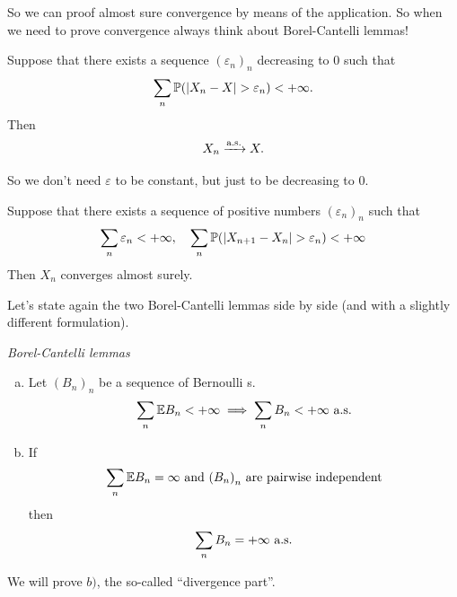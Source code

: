 \documentclass{report}
\begin{document}
So we can proof almost sure convergence by means of the application. So when we need to prove convergence always think about Borel-Cantelli lemmas!
\begin{proposition}
	Suppose that there exists a sequence ${(\varepsilon_n)}_{n}$ decreasing to 0 such that
	\[\sum_n\pr(|X_n-X|>\varepsilon_n)<+\infty.\]
	Then
	\[X_n\xrightarrow[]{\text{a.s.}} X.\]
\end{proposition}
So we don't need $\varepsilon$ to be constant, but just to be decreasing to 0.
\begin{proposition}
	Suppose that there exists a sequence of positive numbers ${(\varepsilon_n)}_{n}$ such that
	\[\sum_n\varepsilon_n<+\infty,\quad\sum_n\pr(|X_{n+1}-X_n|>\varepsilon_n)<+\infty\]
	Then $X_n$ converges almost surely.
\end{proposition}
Let's state again the two Borel-Cantelli lemmas side by side (and with a slightly different formulation).
\begin{theorem}
	\emph{Borel-Cantelli lemmas}\\
	\begin{enumerate}[a)]
		\item Let ${(B_n)}_{n}$ be a sequence of Bernoulli \rv s.
	\[\sum_n \mathbb{E} B_n<+\infty\implies\sum_n B_n<+\infty\text{ a.s.}\]
	\item If 
	\[\sum_n\mathbb{E} B_n=\infty\text{ and }{(B_n)}_{n}\text{ are pairwise independent}\]
	then
	\[\sum_n B_n=+\infty\text{ a.s.}\]
	\end{enumerate}
\end{theorem}
We will prove $b)$, the so-called ``divergence part''.
\end{document}
